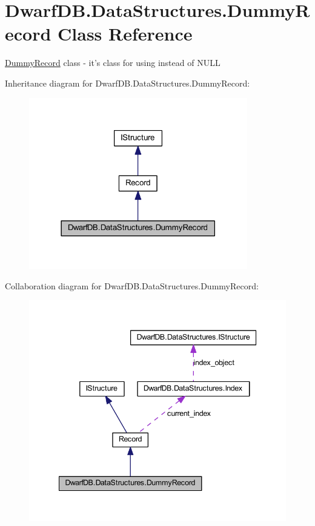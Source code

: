 \hypertarget{class_dwarf_d_b_1_1_data_structures_1_1_dummy_record}{\section{Dwarf\+D\+B.\+Data\+Structures.\+Dummy\+Record Class Reference}
\label{class_dwarf_d_b_1_1_data_structures_1_1_dummy_record}
}


\hyperlink{class_dwarf_d_b_1_1_data_structures_1_1_dummy_record}{Dummy\+Record} class -\/ it's class for using instead of N\+U\+L\+L  




Inheritance diagram for Dwarf\+D\+B.\+Data\+Structures.\+Dummy\+Record\+:
\nopagebreak
\begin{figure}[H]
\begin{center}
\leavevmode
\includegraphics[width=270pt]{class_dwarf_d_b_1_1_data_structures_1_1_dummy_record__inherit__graph}
\end{center}
\end{figure}


Collaboration diagram for Dwarf\+D\+B.\+Data\+Structures.\+Dummy\+Record\+:
\nopagebreak
\begin{figure}[H]
\begin{center}
\leavevmode
\includegraphics[width=342pt]{class_dwarf_d_b_1_1_data_structures_1_1_dummy_record__coll__graph}
\end{center}
\end{figure}
